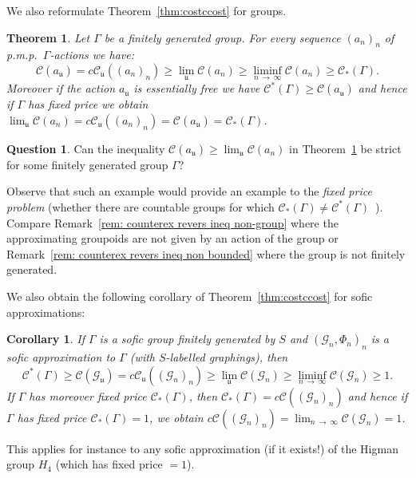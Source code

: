 \documentclass[10pt]{amsart}
\newtheorem{theo}[cdrthm]{Theorem}
\newtheorem{coro}[cdrthm]{Corollary}
\theoremstyle{definition}
\newtheorem{ques}[cdrthm]{Question}
\newcommand{\cost}{\mathcal{C}}
\newcommand{\ccost}{c\mathcal{C}}
\newcommand{\cg}{\mathcal{G}}
\newcommand{\vraicost}{\mathscr{C}}
\newcommand{\ul}{\mathfrak{u}}
\newcommand{\pmp}{p.m.p.\ }
\begin{document}
We also reformulate Theorem~\ref{thm:costccost} for groups.

\begin{theo}\label{th: equality of lim cost for fixed price}
Let $\Gamma$ be a finitely generated group. For every sequence $(a_n)_n$ of \pmp $\Gamma$-actions we have:
\begin{equation}\label{eq: ineqs an, bn}
\cost(a_\ul)=\ccost_\ul((a_n)_n) \geq \lim_{\ul}\cost(a_{n})\geq \liminf_{n\,\to\,\infty}\cost(a_{n}) \geq \vraicost_*(\Gamma).
\end{equation}
Moreover if the action $a_\ul$ is essentially free we have $\vraicost^*(\Gamma)\geq \cost(a_\ul)$ and hence if $\Gamma$ has fixed price we obtain $\lim_\ul\cost(a_n)=\ccost_\ul((a_n)_n)=\cost(a_{\ul})=\vraicost_*(\Gamma)$.
\end{theo}

\begin{ques}\label{qst:cont}
Can the inequality $\cost(a_\ul)\geq\lim_\ul\cost(a_n)$ in Theorem~\ref{th: equality of lim cost for fixed price} be strict for some finitely generated group $\Gamma$?
\end{ques} Observe that such an example would provide an example to the {\em fixed price problem} (whether there are countable groups for which $\vraicost_*(\Gamma)\not=\vraicost^*(\Gamma)$~\cite[Question~I.8]{Gab-cost}). Compare Remark~\ref{rem: counterex revers ineq non-group} where the approximating groupoids are not given by an action of the group or Remark~\ref{rem: counterex revers ineq non bounded} where the group is not finitely generated.


We also obtain the following corollary of Theorem~\ref{thm:costccost} for sofic approximations:
\begin{coro}\label{cor: sofic gp - sofic approx - comb cost}
If $\Gamma$ is a sofic group finitely generated by $S$ and $(\cg_n, \Phi_n)_n$ is a sofic approximation to $\Gamma$ (with $S$-labelled graphings), then
\begin{equation}
\vraicost^*(\Gamma)\geq \cost(\cg_\ul)=\ccost_\ul((\cg_n)_n) \geq \lim_{\ul}\cost(\cg_{n})\geq \liminf_{n\,\to\,\infty}\cost(\cg_{n}) \geq 1.
\end{equation}
If $\Gamma$ has moreover fixed price $\vraicost_*(\Gamma)$, then $\vraicost_*(\Gamma)=\ccost((\cg_n)_n) $ and hence if $\Gamma$ has fixed price $\vraicost_*(\Gamma)=1$, we obtain $\ccost((\cg_n)_n) = \lim_{n\,\to\,\infty}\cost(\cg_{n}) = 1$.
\end{coro}

This applies for instance to any sofic approximation (if it exists!) of the Higman group $H_4$ (which has fixed price $=1$).
\end{document}
